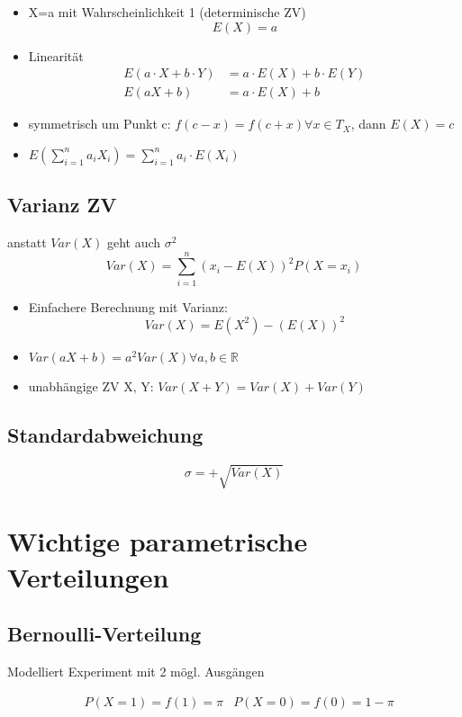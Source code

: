 \documentclass[10pt,a4paper,landscape]{article}
\begin{document}
\begin{multicols}{4}
\begin{itemize}
\item X=a mit Wahrscheinlichkeit 1 (determinische ZV)
\[
E(X)=a
\]
\item Linearität
\begin{align*}
E(a\cdot X + b \cdot Y) &= a\cdot E(X) + b \cdot	E(Y) \\
E(aX+b) &= a\cdot E(X) + b
\end{align*}
\item symmetrisch um Punkt c: $f(c-x)=f(c+x) \forall x \in T_X$, dann $E(X)=c$
\item $E\left(\sum_{i=1}^na_iX_i\right)=\sum_{i=1}^na_i \cdot E(X_i)$
\end{itemize}

\subsection{Varianz ZV}
anstatt $Var(X)$ geht auch $\sigma^2$
\[
Var(X) = \sum_{i=1}^n (x_i - E(X))^2P(X=x_i)
\]

\begin{itemize}
\item Einfachere Berechnung mit Varianz:
\[
Var(X)=E(X^2)-(E(X))^2
\]
\item $Var(aX+b)=a^2Var(X) \forall a,b \in \mathbb{R}$
\item unabhängige ZV X, Y: $Var(X+Y)=Var(X)+Var(Y)$
\end{itemize}

\subsection{Standardabweichung}
\[
\sigma = + \sqrt{Var(X)}
\]


\section{Wichtige parametrische Verteilungen}

\subsection{Bernoulli-Verteilung}
Modelliert Experiment mit 2 mögl. Ausgängen

\begin{align*}
& P(X=1)=f(1) = \pi
& P(X=0)=f(0) = 1 - \pi
\end{align*}


\end{multicols}
\end{document}
